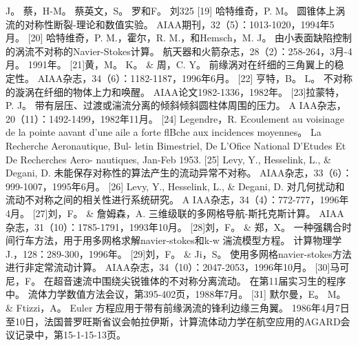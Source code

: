 \documentclass[UTF8,11pt,a4paper,openany,fontset=fandol]{ctexbook}
\begin{document}
J。 蔡，H-M。 蔡英文，S。 罗和F。 刘325 [19] 哈特维奇，P. M。 圆锥体上涡流的对称性断裂-理论和数值实验。 AIAA期刊，32（5）：1013-1020，1994年5月。 [20] 哈特维奇，P. M.，霍尔，R. M.，和Hemsch，M. J。 由小表面缺陷控制的涡流不对称的Navier-Stokes计算。 航天器和火箭杂志，28（2）：258-264，3月-4月。 1991年。 [21]黄，M。 K。 \& 周，C. Y。 前缘涡对在纤细的三角翼上的稳定性。 AIAA杂志，34（6）：1182-1187，1996年6月。 [22] 亨特，B。 L。 不对称的漩涡在纤细的物体上力和唤醒。 AIAA论文1982-1336，1982年。 [23]拉蒙特，P. J。 带有层压、过渡或湍流分离的倾斜倾斜圆柱体周围的压力。 A IAA杂志，20（11）：1492-1499，1982年11月。 [24] Legendre，R. Ecoulement au voisinage de la pointe aavant d'une aile a forte flBche aux incidences moyennes。 La Recherche Aeronautique, Bul- letin Bimestriel, De L'Ofice National D'Etudes Et De Recherches Aero- nautiques, Jan-Feb 1953. [25] Levy, Y., Hesselink, L., \& Degani, D. 未能保存对称性的算法产生的流动异常不对称。 AIAA杂志，33（6）：999-1007，1995年6月。 [26] Levy, Y., Hesselink, L., \& Degani, D. 对几何扰动和流动不对称之间的相关性进行系统研究。 A IAA杂志，34（4）：772-777，1996年4月。 [27]刘，F。 \& 詹姆森，A. 三维级联的多网格导航-斯托克斯计算。 AIAA杂志，31（10）：1785-1791，1993年10月。 [28]刘，F。 \& 郑，X。 一种强耦合时间行车方法，用于用多网格求解navier-stokes和k-w 湍流模型方程。 计算物理学J.，128：289-300，1996年。 [29]刘，F。 \& Ji，S。 使用多网格navier-stokes方法进行非定常流动计算。 AIAA杂志，34（10）：2047-2053，1996年10月。 [30]马可尼，F。 在超音速流中围绕尖锐锥体的不对称分离流动。 在第11届实习生的程序中。 流体力学数值方法会议，第395-402页，1988年7月。 [31] 默尔曼，E。 M。 \& Ftizzi，A。 Euler 方程应用于带有前缘涡流的锋利边缘三角翼。 1986年4月7日至10日，法国普罗旺斯省议会帕拉伊斯，计算流体动力学在航空应用的AGARD会议记录中，第15-1-15-13页。
\end{document}
